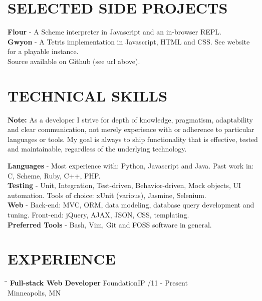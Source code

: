 \documentclass{res}
\begin{document}
 

\address{ 
\texttt{http://nicolasmiller.github.com} \\
\texttt{nicolasmiller@gmail.com} \\   
612-965-1669 \\
}
                   
\begin{resume}

\section{SELECTED SIDE PROJECTS}
	{\bf Flour} - A Scheme interpreter in Javascript and an in-browser REPL. \\
 	{\bf Gwyon} - A Tetris implementation in Javascript, HTML and CSS. See website for a playable instance. \\
Source available on Github (see url above).
\vspace{-1em}
\section{TECHNICAL SKILLS} 
	{\bf Note:} As a developer I strive for depth of knowledge, pragmatism, adaptability and clear communication, not merely experience with or adherence to particular languages or tools. My goal is always to ship functionality that is effective, tested and maintainable, regardless of the underlying technology.
	
	\vspace{-0.5em}
	{\bf Languages} - Most experience with: Python, Javascript and Java. Past work in: C, Scheme, Ruby, C++, PHP. \\
	{\bf Testing} - Unit, Integration, Test-driven, Behavior-driven, Mock objects, UI automation. Tools of choice: xUnit (various), Jasmine, Selenium. \\
	{\bf Web} - Back-end: MVC, ORM, data modeling, database query development and tuning. Front-end: jQuery, AJAX, JSON, CSS, templating. \\
	{\bf Preferred Tools} - Bash, Vim, Git and FOSS software in general. \\
\vspace{-2em}
\section{EXPERIENCE}
\vspace{-0.05in}
\begin{tabbing}
	\hspace{2.3in}\= \hspace{2.6in}\= \kill
    {\bf Full-stack Web Developer} \>FoundationIP     /11 - Present\\
                             \>Minneapolis, MN
\end{tabbing}
\vspace{-1.5em}


\end{resume}
\end{document}
